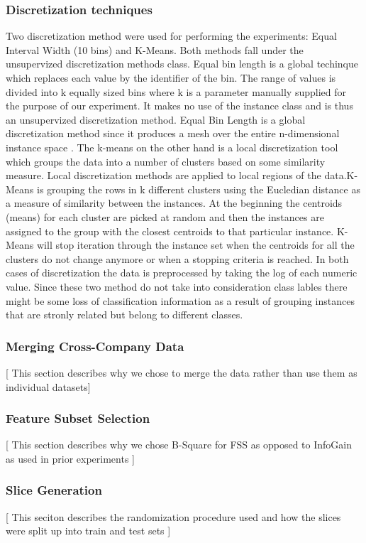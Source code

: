 \documentclass{sig-alternate}
\begin{document}
 
\subsubsection{Discretization techniques} 
Two discretization method were used for performing the experiments: Equal Interval Width (10 bins) and K-Means. Both methods fall under the unsupervized discretization methods class. Equal bin length is a global techinque which replaces each value by the identifier of the bin. The range of values is divided into k equally sized bins where k is a parameter manually supplied for the purpose of our experiment. It makes no use of the instance class and is thus an unsupervized discretization method. Equal Bin Length is a global discretization  method since it produces a mesh over the entire n-dimensional instance space \cite {dough95}. The k-means on the other hand is a local discretization tool which groups the data into a number of clusters based on some similarity measure. Local discretization methods are applied to local regions of the data.K-Means is grouping the rows in k different clusters using the Eucledian distance as a measure of similarity between the instances. At the beginning the centroids (means) for each cluster are picked at random and then the instances are assigned to the group with the closest centroids to that particular instance. K-Means will stop iteration through the instance set when the centroids for all the clusters do not change anymore or when a stopping criteria is reached. In both cases of discretization the data is preprocessed by taking the log of each numeric value. Since these two method do not take into consideration class lables there might be some loss of classification information as a result of grouping instances that are stronly related but belong to different classes. 

\subsubsection{Merging Cross-Company Data}
[ This section describes why we chose to merge the data rather than use them as individual datasets]


\subsubsection{Feature Subset Selection}
[ This section describes why we chose B-Square for FSS as opposed to InfoGain as used in prior experiments ]

\subsubsection{Slice Generation}
[ This seciton describes the randomization procedure used and how the slices were split up into train and test sets ]
\end{document}
